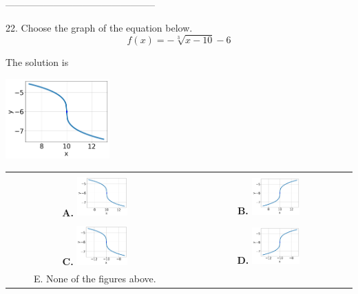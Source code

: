 \documentclass{extbook}[14pt]
\begin{document}
-----------------------------------------------

22. Choose the graph of the equation below.
\[ f(x) = - \sqrt[3]{x - 10} - 6 \] 

 
 The solution is  
 \begin{center} \includegraphics[width=0.3\textwidth]{../Figures/radicalEquationToGraphBC.png} \end{center}\begin{tabular}{|c|c|} 
\hline 
 & \tabularnewline 
 \textbf{A.} \includegraphics[width=0.3\textwidth]{../Figures/radicalEquationToGraphBC.png} & \textbf{B.} \includegraphics[width=0.3\textwidth]{../Figures/radicalEquationToGraphCC.png} \tabularnewline 
\hline 
 & \tabularnewline 
 \textbf{C.} \includegraphics[width=0.3\textwidth]{../Figures/radicalEquationToGraphDC.png} & \textbf{D.} \includegraphics[width=0.3\textwidth]{../Figures/radicalEquationToGraphAC.png} \tabularnewline 
\hline 
 E. None of the figures above. & \tabularnewline 
\hline 
 \end{tabular} 
 
\end{document}
